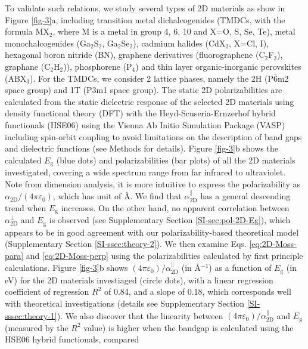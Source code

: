 \documentclass[journal=ancac3,manuscript=article,email=true,hyperref=true,keywords=false]{achemso}
\begin{document}
To validate such relations, we study several types of 2D materials as
show in Figure \ref{fig-3}a, including transition metal
dichalcogenides (TMDCs, with the formula MX\(_{\text{2}}\), where M is
a metal in group 4, 6, 10 and X=O, S, Se, Te), metal monochalcogenides
(Ga$_{2}$S$_{2}$, Ga$_{2}$Se$_{2}$), cadmium halides (CdX$_2$, X=Cl,
I), hexagonal boron nitride (BN), graphene derivatives (fluorographene
(C$_{2}$F$_{2}$), graphane (C$_{2}$H$_{2}$)), phosphorene (P$_{4}$)
and thin layer organic-inorganic perovskites (ABX$_{3}$).  For the
TMDCs, we consider 2 lattice phases, namely the 2H (P\(\bar{6}\)m2
space group) and 1T (P3m1 space group).  The static 2D
polarizabilities are calculated from the static dielectric response of
the selected 2D materials using density functional theory (DFT) with
the Heyd-Scuseria-Ernzerhof hybrid functionals (HSE06) using the
Vienna Ab Initio Simulation Package (VASP) including spin-orbit
coupling to avoid limitations on the description of band gaps and
dielectric functions (see Methods for details). Figure \ref{fig-3}b
shows the calculated $E_{\mathrm{g}}$ (blue dots) and polarizabilities
(bar plots) of all the 2D materials investigated, covering a wide
spectrum range from far infrared to ultraviolet. Note from dimension
analysis, it is more intuitive to express the polarizability as
$\alpha_{\mathrm{2D}}/(4 \pi \varepsilon_{0})$, which has unit of
\AA. We find that $\alpha_{\mathrm{2D}}^{\parallel}$ has a general
descending trend when $E_{\mathrm{g}}$ increases. On the other hand,
no apparent correlation between $\alpha_{\mathrm{2D}}^{\perp}$ and
$E_{\mathrm{g}}$ is observed (see Supplementary Section
\ref{SI-sec:pol-2D-Eg}), which appears to be in good agreement with
our polarizability-based theoretical model (Supplementary Section
\ref{SI-ssec:theory-2}). We then examine Eqs. \ref{eq:2D-Moss-para}
and \ref{eq:2D-Moss-perp} using the polarizabilities calculated by
first principle calculations. Figure \ref{fig-3}b shows
$(4 \pi \varepsilon_{0})/\alpha_{\mathrm{2D}}^{\parallel}$ (in
\AA{}$^{-1}$) as a function of $E_{\mathrm{g}}$ (in eV) for the 2D
materials investiaged (circle dots), with a linear regression
coefficient of regression $R^{2}$ of 0.84, and a slope of 0.18, which
corresponds well with theoretical investigations (details see
Supplementary Section \ref{SI-sssec:theory-1}).  We also discover that
the linearity between
$(4 \pi \varepsilon_{0})/\alpha_{\mathrm{2D}}^{\parallel}$ and
$E_{\mathrm{g}}$ (measured by the $R^{2}$ value) is higher when the
bandgap is calculated using the HSE06 hybrid functionals, compared
\end{document}
